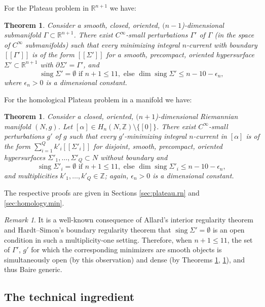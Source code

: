 \documentclass[11pt, letterpaper, reqno]{amsart}
\numberwithin{equation}{section}
\newtheorem{Thm}[Def]{Theorem}
\theoremstyle{remark}
\newtheorem{Rem}[Def]{Remark}
\newcommand{\RR}{\mathbb{R}}
\newcommand{\ZZ}{\mathbb{Z}}
\newcommand{\sing}{\operatorname{sing}}
\newcommand{\llbracket}{[\![}
\newcommand{\rrbracket}{]\!]}
\begin{document}
For the Plateau problem in $\RR^{n+1}$ we have:
\begin{Thm} \label{theo:main.rn.11}
	Consider a smooth, closed, oriented, $(n-1$)-dimensional submanifold $\Gamma \subset \RR^{n+1}$. There exist $C^\infty$-small perturbations $\Gamma'$ of $\Gamma$ (in the space of $C^\infty$ submanifolds) such that every minimizing integral $n$-current with boundary $\llbracket \Gamma' \rrbracket$ is of the form $\llbracket \Sigma' \rrbracket$ for a smooth, precompact, oriented hypersurface $\Sigma' \subset \RR^{n+1}$ with $\partial \Sigma' = \Gamma'$, and
	\[ \sing \Sigma' = \emptyset \text{ if } n+1 \leq 11, \text{ else } \dim \sing \Sigma' \leq n-10-\epsilon_n, \]
	where $\epsilon_n > 0$ is a dimensional constant.
\end{Thm}
For the homological Plateau problem in a manifold we have:
\begin{Thm} \label{theo:main.homology.11}
	Consider a closed, oriented, $(n+1$)-dimensional Riemannian manifold $(N, g)$. Let $[\alpha] \in H_n(N, \ZZ) \setminus \{ [0] \}$. There exist $C^\infty$-small perturbations $g'$ of $g$ such that every $g'$-minimizing integral $n$-current in $[\alpha]$ is of the form $\sum_{i=1}^Q k'_i \llbracket \Sigma'_i \rrbracket$ for disjoint, smooth, precompact, oriented hypersurfaces $\Sigma'_1, \ldots, \Sigma'_Q \subset N$ without boundary and
	\[ \sing \Sigma'_i = \emptyset \text{ if } n+1 \leq 11, \text{ else } \dim \sing \Sigma'_i \leq n-10-\epsilon_n, \]
	and multiplicities $k'_1, \ldots, k'_Q \in \ZZ$; again, $\epsilon_n > 0$ is a dimensional constant.
\end{Thm}

The respective proofs are given in Sections \ref{sec:plateau.rn} and \ref{sec:homology.min}.

\begin{Rem}
    It is a well-known consequence of Allard's interior regularity theorem \cite{Allard:first-variation} and Hardt--Simon's boundary regularity theorem \cite{Hardt-Simon:boundary-regularity} that $\sing \Sigma' = \emptyset$ is an open condition in such a multiplicity-one setting. Therefore, when $n+1 \leq 11$, the set of $\Gamma'$, $g'$ for which the corresponding minimizers are smooth objects is simultaneously open (by this observation) and dense (by Theorems \ref{theo:main.rn.11}, \ref{theo:main.homology.11}), and thus Baire generic.
\end{Rem}

\subsection{The technical ingredient}
\end{document}
